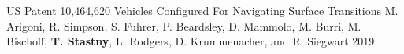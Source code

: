 \begin{cventries}

\begin{flushleft}
\end{flushleft}

\cvpubentry
	{US Patent 10,464,620} %
	{Vehicles Configured For Navigating Surface Transitions} %
	{M. Arigoni, R. Simpson, S. Fuhrer, P. Beardsley, D. Mammolo, M. Burri, M. Bischoff, \textbf{T. Stastny}, L. Rodgers, D. Krummenacher, and R. Siegwart} %
	{} %
	{2019} %
	{} %
	{} %

\end{cventries}
